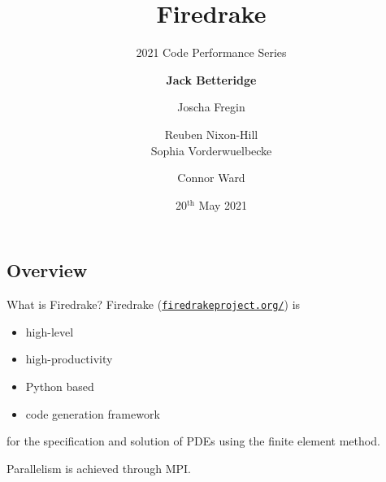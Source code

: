 \documentclass[pdf,aspectratio=169]{beamer}
\title[Firedrake]{Firedrake}
\subtitle{2021 Code Performance Series}
\author[JB,JF,RNH,SV,CW]{\textbf{Jack Betteridge} \and Joscha Fregin \and Reuben Nixon-Hill \\ Sophia Vorderwuelbecke \and Connor Ward}
\date[20/5/2021]{20${}^\text{th}$ May 2021}
\begin{document}
\maketitle

\subsection{Overview}
\begin{frame}{What is Firedrake?}
Firedrake (\href{http://firedrakeproject.org/}{\texttt{firedrakeproject.org/}}) is
\begin{itemize}
	\item high-level
	\item high-productivity
	\item Python based
	\item code generation framework
\end{itemize}
for the specification and solution of PDEs using the finite element method. 

Parallelism is achieved through MPI.
\end{frame}

\end{document}
